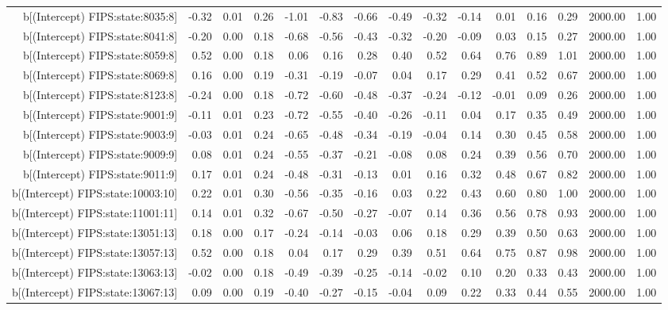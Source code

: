 \begin{table}[ht]
\begin{tabular}{rrrrrrrrrrrrrrr}
  b[(Intercept) FIPS:state:8035:8] & -0.32 & 0.01 & 0.26 & -1.01 & -0.83 & -0.66 & -0.49 & -0.32 & -0.14 & 0.01 & 0.16 & 0.29 & 2000.00 & 1.00 \\ 
  b[(Intercept) FIPS:state:8041:8] & -0.20 & 0.00 & 0.18 & -0.68 & -0.56 & -0.43 & -0.32 & -0.20 & -0.09 & 0.03 & 0.15 & 0.27 & 2000.00 & 1.00 \\ 
  b[(Intercept) FIPS:state:8059:8] & 0.52 & 0.00 & 0.18 & 0.06 & 0.16 & 0.28 & 0.40 & 0.52 & 0.64 & 0.76 & 0.89 & 1.01 & 2000.00 & 1.00 \\ 
  b[(Intercept) FIPS:state:8069:8] & 0.16 & 0.00 & 0.19 & -0.31 & -0.19 & -0.07 & 0.04 & 0.17 & 0.29 & 0.41 & 0.52 & 0.67 & 2000.00 & 1.00 \\ 
  b[(Intercept) FIPS:state:8123:8] & -0.24 & 0.00 & 0.18 & -0.72 & -0.60 & -0.48 & -0.37 & -0.24 & -0.12 & -0.01 & 0.09 & 0.26 & 2000.00 & 1.00 \\ 
  b[(Intercept) FIPS:state:9001:9] & -0.11 & 0.01 & 0.23 & -0.72 & -0.55 & -0.40 & -0.26 & -0.11 & 0.04 & 0.17 & 0.35 & 0.49 & 2000.00 & 1.00 \\ 
  b[(Intercept) FIPS:state:9003:9] & -0.03 & 0.01 & 0.24 & -0.65 & -0.48 & -0.34 & -0.19 & -0.04 & 0.14 & 0.30 & 0.45 & 0.58 & 2000.00 & 1.00 \\ 
  b[(Intercept) FIPS:state:9009:9] & 0.08 & 0.01 & 0.24 & -0.55 & -0.37 & -0.21 & -0.08 & 0.08 & 0.24 & 0.39 & 0.56 & 0.70 & 2000.00 & 1.00 \\ 
  b[(Intercept) FIPS:state:9011:9] & 0.17 & 0.01 & 0.24 & -0.48 & -0.31 & -0.13 & 0.01 & 0.16 & 0.32 & 0.48 & 0.67 & 0.82 & 2000.00 & 1.00 \\ 
  b[(Intercept) FIPS:state:10003:10] & 0.22 & 0.01 & 0.30 & -0.56 & -0.35 & -0.16 & 0.03 & 0.22 & 0.43 & 0.60 & 0.80 & 1.00 & 2000.00 & 1.00 \\ 
  b[(Intercept) FIPS:state:11001:11] & 0.14 & 0.01 & 0.32 & -0.67 & -0.50 & -0.27 & -0.07 & 0.14 & 0.36 & 0.56 & 0.78 & 0.93 & 2000.00 & 1.00 \\ 
  b[(Intercept) FIPS:state:13051:13] & 0.18 & 0.00 & 0.17 & -0.24 & -0.14 & -0.03 & 0.06 & 0.18 & 0.29 & 0.39 & 0.50 & 0.63 & 2000.00 & 1.00 \\ 
  b[(Intercept) FIPS:state:13057:13] & 0.52 & 0.00 & 0.18 & 0.04 & 0.17 & 0.29 & 0.39 & 0.51 & 0.64 & 0.75 & 0.87 & 0.98 & 2000.00 & 1.00 \\ 
  b[(Intercept) FIPS:state:13063:13] & -0.02 & 0.00 & 0.18 & -0.49 & -0.39 & -0.25 & -0.14 & -0.02 & 0.10 & 0.20 & 0.33 & 0.43 & 2000.00 & 1.00 \\ 
  b[(Intercept) FIPS:state:13067:13] & 0.09 & 0.00 & 0.19 & -0.40 & -0.27 & -0.15 & -0.04 & 0.09 & 0.22 & 0.33 & 0.44 & 0.55 & 2000.00 & 1.00 \\ 

\end{tabular}
\end{table}
